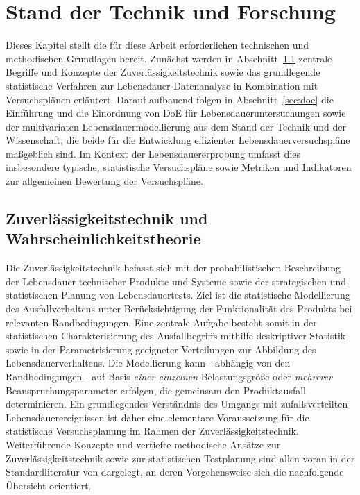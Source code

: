 \chapter{Stand der Technik und Forschung} \label{chap:stand}

Dieses Kapitel stellt die für diese Arbeit erforderlichen technischen und methodischen Grundlagen bereit. Zunächst werden in Abschnitt~\ref{sec:zuv} zentrale Begriffe und Konzepte der Zuverlässigkeitstechnik sowie das grundlegende statistische Verfahren zur Lebensdauer-Datenanalyse in Kombination mit Versuchsplänen erläutert.
Darauf aufbauend folgen in Abschnitt~\ref{sec:doe} die Einführung und die Einordnung von \acs{DoE} für Lebensdaueruntersuchungen sowie der multivariaten Lebensdauermodellierung aus dem Stand der Technik und der Wissenschaft, die beide für die Entwicklung effizienter Lebensdauerversuchspläne maßgeblich sind.
Im Kontext der Lebensdauererprobung umfasst dies insbesondere typische, statistische Versuchspläne sowie Metriken und Indikatoren zur allgemeinen Bewertung der Versuchspläne.

\section{Zuverlässigkeitstechnik und Wahrscheinlichkeitstheorie} \label{sec:zuv}
Die Zuverlässigkeitstechnik befasst sich mit der probabilistischen Beschreibung der Lebensdauer technischer Produkte und Systeme sowie der strategischen und statistischen Planung von Lebensdauertests.
Ziel ist die statistische Modellierung des Ausfallverhaltens unter Berücksichtigung der Funktionalität des Produkts bei relevanten Randbedingungen.
Eine zentrale Aufgabe besteht somit in der statistischen Charakterisierung des Ausfallbegriffs mithilfe deskriptiver Statistik sowie in der Parametrisierung geeigneter Verteilungen zur Abbildung des Lebensdauerverhaltens.
Die Modellierung kann - abhängig von den Randbedingungen - auf Basis \textit{einer einzelnen} Belastungsgröße oder \textit{mehrerer} Beanspruchungsparameter erfolgen, die gemeinsam den Produktausfall determinieren.
Ein grundlegendes Verständnis des Umgangs mit zufallsverteilten Lebensdauerereignissen ist daher eine elementare Voraussetzung für die statistische Versuchsplanung im Rahmen der Zuverlässigkeitstechnik.
Weiterführende Konzepte und vertiefte methodische Ansätze zur Zuverlässigkeitstechnik sowie zur statistischen Testplanung sind allen voran in der Standardliteratur von \textcite{Bertsche.2022} dargelegt, an deren Vorgehensweise sich die nachfolgende Übersicht orientiert.

